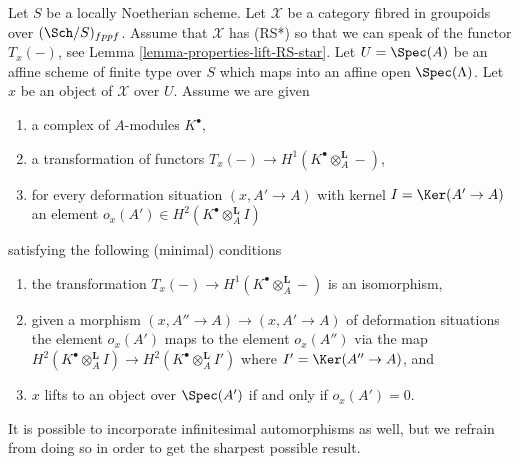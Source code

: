 \begin{situation}
\label{situation-dual}
Let $S$ be a locally Noetherian scheme. Let $\mathcal{X}$ be a category
fibred in groupoids over $(\Sch/S)_{fppf}$. Assume that
$\mathcal{X}$ has (RS*) so that we can speak of the functor $T_x(-)$, see
Lemma \ref{lemma-properties-lift-RS-star}.
Let $U = \Spec(A)$ be an affine scheme of finite type over $S$ which maps
into an affine open $\Spec(\Lambda)$. Let $x$ be an object of $\mathcal{X}$
over $U$. Assume we are given
\begin{enumerate}
\item a complex of $A$-modules $K^\bullet$,
\item a transformation of functors
$T_x(-) \to H^1(K^\bullet \otimes_A^\mathbf{L} -)$,
\item for every deformation situation $(x, A' \to A)$ with kernel
$I = \Ker(A' \to A)$ an element
$o_x(A') \in H^2(K^\bullet \otimes_A^\mathbf{L} I)$
\end{enumerate}
satisfying the following (minimal) conditions
\begin{enumerate}
\item[(i)] the transformation
$T_x(-) \to H^1(K^\bullet \otimes_A^\mathbf{L} -)$
is an isomorphism,
\item[(ii)] given a morphism $(x, A'' \to A) \to (x, A' \to A)$ of deformation
situations the element $o_x(A')$ maps to the element $o_x(A'')$
via the map
$H^2(K^\bullet \otimes_A^\mathbf{L} I) \to
H^2(K^\bullet \otimes_A^\mathbf{L} I')$
where $I' = \Ker(A'' \to A)$, and
\item[(iii)] $x$ lifts to an object over $\Spec(A')$ if and only if
$o_x(A') = 0$.
\end{enumerate}
It is possible to incorporate infinitesimal automorphisms as well, but
we refrain from doing so in order to get the sharpest possible result.
\end{situation}